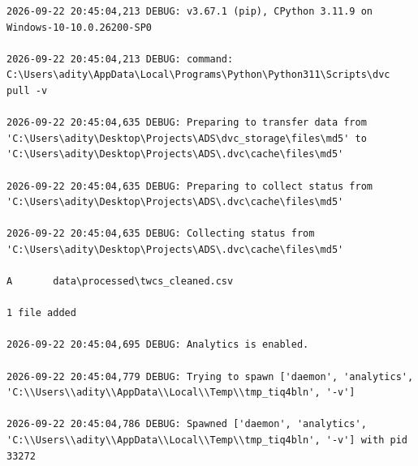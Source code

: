 \documentclass[11pt, a4paper]{article}
\begin{document}
\begin{footnotesize}
\begin{verbatim}
﻿2026-09-22 20:45:04,213 DEBUG: v3.67.1 (pip), CPython 3.11.9 on Windows-10-10.0.26200-SP0

2026-09-22 20:45:04,213 DEBUG: command: C:\Users\adity\AppData\Local\Programs\Python\Python311\Scripts\dvc pull -v

2026-09-22 20:45:04,635 DEBUG: Preparing to transfer data from 'C:\Users\adity\Desktop\Projects\ADS\dvc_storage\files\md5' to 'C:\Users\adity\Desktop\Projects\ADS\.dvc\cache\files\md5'

2026-09-22 20:45:04,635 DEBUG: Preparing to collect status from 'C:\Users\adity\Desktop\Projects\ADS\.dvc\cache\files\md5'

2026-09-22 20:45:04,635 DEBUG: Collecting status from 'C:\Users\adity\Desktop\Projects\ADS\.dvc\cache\files\md5'

A       data\processed\twcs_cleaned.csv

1 file added

2026-09-22 20:45:04,695 DEBUG: Analytics is enabled.

2026-09-22 20:45:04,779 DEBUG: Trying to spawn ['daemon', 'analytics', 'C:\\Users\\adity\\AppData\\Local\\Temp\\tmp_tiq4bln', '-v']

2026-09-22 20:45:04,786 DEBUG: Spawned ['daemon', 'analytics', 'C:\\Users\\adity\\AppData\\Local\\Temp\\tmp_tiq4bln', '-v'] with pid 33272


\end{verbatim}
\end{footnotesize}
\end{document}
